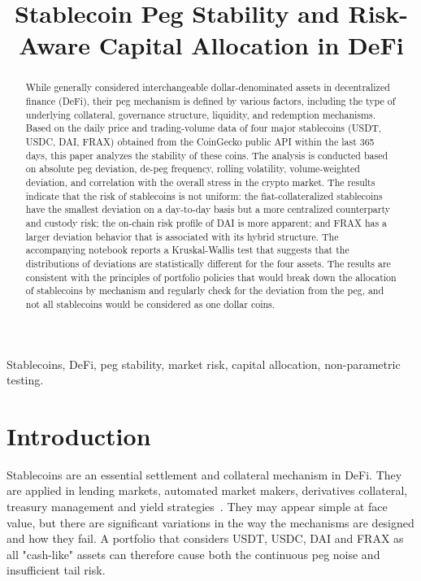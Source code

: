 \documentclass[conference]{IEEEtran}
\title{Stablecoin Peg Stability and Risk-Aware Capital Allocation in DeFi}
\author{
\IEEEauthorblockN{Engin Samet Dede}
\IEEEauthorblockA{
University of Geneva\\
Geneva, Switzerland\\
GitHub: \url{https://github.com/Engn21}
}
}
\begin{document}
\maketitle

\begin{abstract}
While generally considered interchangeable dollar-denominated assets in decentralized finance (DeFi), their peg mechanism is defined by various factors, including the type of underlying collateral, governance structure, liquidity, and redemption mechanisms. Based on the daily price and trading-volume data of four major stablecoins (USDT, USDC, DAI, FRAX) obtained from the CoinGecko public API within the last 365 days, this paper analyzes the stability of these coins. The analysis is conducted based on absolute peg deviation, de-peg frequency, rolling volatility, volume-weighted deviation, and correlation with the overall stress in the crypto market. The results indicate that the risk of stablecoins is not uniform: the fiat-collateralized stablecoins have the smallest deviation on a day-to-day basis but a more centralized counterparty and custody risk; the on-chain risk profile of DAI is more apparent; and FRAX has a larger deviation behavior that is associated with its hybrid structure. The accompanying notebook reports a Kruskal-Wallis test that suggests that the distributions of deviations are statistically different for the four assets. The results are consistent with the principles of portfolio policies that would break down the allocation of stablecoins by mechanism and regularly check for the deviation from the peg, and not all stablecoins would be considered as one dollar coins.
\end{abstract}

\begin{IEEEkeywords}
Stablecoins, DeFi, peg stability, market risk, capital allocation, non-parametric testing.
\end{IEEEkeywords}

\section{Introduction}
Stablecoins are an essential settlement and collateral mechanism in DeFi. They are applied in lending markets, automated market makers, derivatives collateral, treasury management and yield strategies~\cite{schar_2021_defi}. They may appear simple at face value, but there are significant variations in the way the mechanisms are designed and how they fail. A portfolio that considers USDT, USDC, DAI and FRAX as all "cash-like" assets can therefore cause both the continuous peg noise and insufficient tail risk. 
\end{document}
